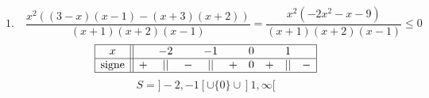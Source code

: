 \documentclass{article}
\begin{document}
\[
\text{1.} \quad \frac{x^2((3-x)(x-1)-(x+3)(x+2))}{(x+1)(x+2)(x-1)} = \frac{x^2(-2x^2-x-9)}{(x+1)(x+2)(x-1)} \le 0
\]
\[
\begin{array}{|c||ccccccccc|}
\hline
x & & -2 & & -1 & & 0 & & 1 & \\
\hline
\text{signe} & + & || & - & || & + & 0 & + & || & - \\
\hline
\end{array}
\]
\[
S = ]-2, -1[ \cup \{0\} \cup ]1, \infty[
\]
\end{document}
